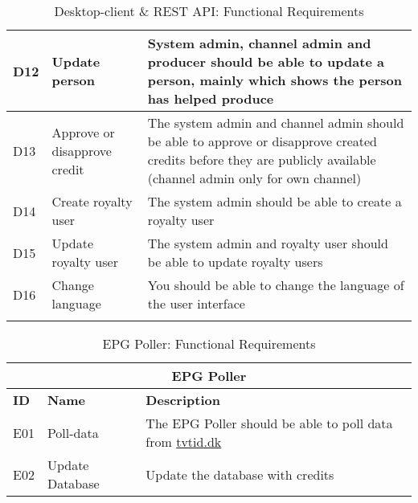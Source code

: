 \begin{longtable}{|p{1cm}|p{3.5cm}|p{11cm}|}
    \hline
    D12 & Update person & System admin, channel admin and producer should be able to update a person, mainly which shows the person has helped produce \\
    \hline
    D13 & Approve or disapprove credit & The system admin and channel admin should be able to approve or disapprove created credits before they are publicly available (channel admin only for own channel) \\
    \hline
    D14 & Create royalty user & The system admin should be able to create a royalty user \\
    \hline
    D15 & Update royalty user & The system admin and royalty user should be able to update royalty users \\%
    \hline
    D16 & Change language & You should be able to change the language of the user interface \\
    \hline
    
    \caption{Desktop-client \& REST API: Functional Requirements}
    \label{tab:desktop_client_rest_api_funreq}
\end{longtable}

\begin{table}[h]
    \begin{tabular}{|p{1cm}|p{3.5cm}|p{11cm}|}
        \hline
        \multicolumn{3}{|c|}{\textbf{EPG Poller}} \\
        \hline
        \textbf{ID} & \textbf{Name} & \textbf{Description} \\
        \hline
        E01 & Poll-data
        &  The EPG Poller should be able to poll data from \href{www.tvtid.tv2.dk}{tvtid.dk} \\
        \hline
        E02 & Update Database & Update the database with credits \\
        \hline
    \end{tabular}
    \caption{EPG Poller: Functional Requirements}
    \label{tab:epg_poller_funreq}
\end{table}